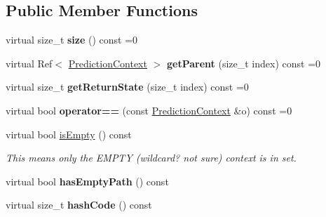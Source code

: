 \subsection*{Public Member Functions}
\begin{DoxyCompactItemize}
\item 
\mbox{\label{classantlr4_1_1atn_1_1PredictionContext_a423450c9759076efa743d9ecc2c37e56}} 
virtual size\+\_\+t {\bfseries size} () const =0
\item 
\mbox{\label{classantlr4_1_1atn_1_1PredictionContext_a55bd645944ae8ef2e078a995b77e7ad5}} 
virtual Ref$<$ \hyperlink{classantlr4_1_1atn_1_1PredictionContext}{Prediction\+Context} $>$ {\bfseries get\+Parent} (size\+\_\+t index) const =0
\item 
\mbox{\label{classantlr4_1_1atn_1_1PredictionContext_aa168e57807979310366f45074092bdff}} 
virtual size\+\_\+t {\bfseries get\+Return\+State} (size\+\_\+t index) const =0
\item 
\mbox{\label{classantlr4_1_1atn_1_1PredictionContext_a94ff0af63e643a2fa1adabe36b874b0a}} 
virtual bool {\bfseries operator==} (const \hyperlink{classantlr4_1_1atn_1_1PredictionContext}{Prediction\+Context} \&o) const =0
\item 
\mbox{\label{classantlr4_1_1atn_1_1PredictionContext_a8340faaad50e405fb78d4a100aae6eb6}} 
virtual bool \hyperlink{classantlr4_1_1atn_1_1PredictionContext_a8340faaad50e405fb78d4a100aae6eb6}{is\+Empty} () const
\begin{DoxyCompactList}\small\item\em This means only the E\+M\+P\+TY (wildcard? not sure) context is in set. \end{DoxyCompactList}\item 
\mbox{\label{classantlr4_1_1atn_1_1PredictionContext_aa0d5c0944350e815ae2ddf433f852c94}} 
virtual bool {\bfseries has\+Empty\+Path} () const
\item 
\mbox{\label{classantlr4_1_1atn_1_1PredictionContext_ad7ab50fdc4e0e82963dcb641660f4135}} 
virtual size\+\_\+t {\bfseries hash\+Code} () const
\end{DoxyCompactItemize}
